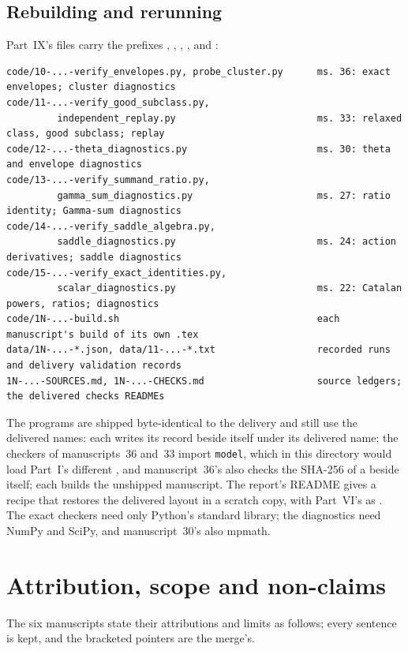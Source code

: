 \documentclass[11pt,a4paper]{article}
\theoremstyle{definition}\newaliascnt{definition}{theorem}
\theoremstyle{remark}\newaliascnt{remark}{theorem}
\begin{document}
\subsection{Rebuilding and rerunning}
\label{jg:sec:reproduce}
Part~IX's files carry the prefixes ,
, ,
,  and
:
\begin{lstlisting}
code/10-...-verify_envelopes.py, probe_cluster.py      ms. 36: exact envelopes; cluster diagnostics
code/11-...-verify_good_subclass.py,
         independent_replay.py                         ms. 33: relaxed class, good subclass; replay
code/12-...-theta_diagnostics.py                       ms. 30: theta and envelope diagnostics
code/13-...-verify_summand_ratio.py,
         gamma_sum_diagnostics.py                      ms. 27: ratio identity; Gamma-sum diagnostics
code/14-...-verify_saddle_algebra.py,
         saddle_diagnostics.py                         ms. 24: action derivatives; saddle diagnostics
code/15-...-verify_exact_identities.py,
         scalar_diagnostics.py                         ms. 22: Catalan powers, ratios; diagnostics
code/1N-...-build.sh                                   each manuscript's build of its own .tex
data/1N-...-*.json, data/11-...-*.txt                  recorded runs and delivery validation records
1N-...-SOURCES.md, 1N-...-CHECKS.md                    source ledgers; the delivered checks READMEs
\end{lstlisting}
The programs are shipped byte-identical to the delivery and still use the
delivered names: each writes its record beside itself under its delivered name;
the checkers of manuscripts~36 and~33 import \texttt{model}, which in this
directory would load Part~I's different , and manuscript~36's
also checks the SHA-256 of a  beside itself; each
 builds the unshipped manuscript. The report's README gives a
recipe that restores the delivered layout in a scratch copy, with Part~VI's
 as . The exact checkers
need only Python's standard library; the diagnostics need NumPy and SciPy, and
manuscript~30's also mpmath.

\section{Attribution, scope and non-claims}
\label{jg:sec:scope}
The six manuscripts state their attributions and limits as follows; every
sentence is kept, and the bracketed pointers are the merge's.
\end{document}
